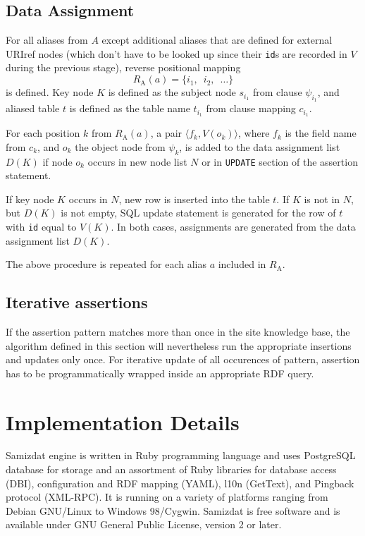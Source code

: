 \documentclass{llncs}
\begin{document}
\subsection{Data Assignment}

For all aliases from $A$ except additional aliases that are defined for
external URIref nodes (which don't have to be looked up since their {\tt id}s
are recorded in $V$ during the previous stage), reverse positional mapping
\begin{equation}
R_\mathrm{A}(a) = \{i_1, \enspace i_2, \enspace \dots\}
\end{equation}
is defined. Key node $K$ is defined as the subject node $s_{i_1}$ from clause
$\psi_{i_1}$, and aliased table $t$ is defined as the table name $t_{i_1}$
from clause mapping $c_{i_1}$.

For each position $k$ from $R_\mathrm{A}(a)$, a pair $\langle f_k, V(o_k)
\rangle$, where $f_k$ is the field name from $c_k$, and $o_k$ the object node
from $\psi_k$, is added to the data assignment list $D(K)$ if node $o_k$
occurs in new node list $N$ or in {\tt UPDATE} section of the assertion
statement.

If key node $K$ occurs in $N$, new row is inserted into the table $t$. If $K$
is not in $N$, but $D(K)$ is not empty, SQL update statement is generated for
the row of $t$ with {\tt id} equal to $V(K)$. In both cases, assignments are
generated from the data assignment list $D(K)$.

The above procedure is repeated for each alias $a$ included in $R_\mathrm{A}$.

\subsection{Iterative assertions}

If the assertion pattern matches more than once in the site knowledge base,
the algorithm defined in this section will nevertheless run the appropriate
insertions and updates only once. For iterative update of all occurences of
pattern, assertion has to be programmatically wrapped inside an appropriate
RDF query.


\section{Implementation Details}

Samizdat engine\cite{samizdat-impl-report} is written in Ruby programming
language and uses PostgreSQL database for storage and an assortment of Ruby
libraries for database access (DBI), configuration and RDF mapping (YAML),
l10n (GetText), and Pingback protocol (XML-RPC). It is running on a variety of
platforms ranging from Debian GNU/Linux to Windows 98/Cygwin. Samizdat is free
software and is available under GNU General Public License, version 2 or
later.
\end{document}
